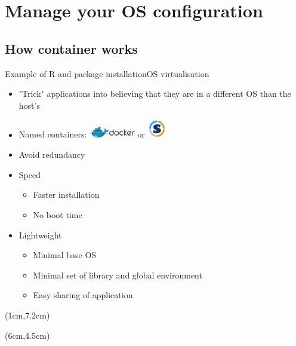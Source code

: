 \section{Manage your OS configuration}
\subsection{How container works}

\begin{frame}{Example of R and package installation}{OS virtualisation}
\begin{itemize}[<+->]
	\item "Trick" applications into believing that they are in a different OS than the host’s
	\item Named containers: \includegraphics[width=2cm, height=0.5cm]{images/docker_logo2.png} or \includegraphics[width=0.8cm, height=0.8cm]{images/singularity_logo.pdf}
	\item Avoid redundancy
	\item<5-> Speed
	\begin{itemize}[<5->]
		\item Faster installation
		\item No boot time
	\end{itemize}
	\item<6-> Lightweight
	\begin{itemize}[<6->]
		\item Minimal base OS
		\item Minimal set of library and global environment 
		\item Easy sharing of application 
	\end{itemize}	
\end{itemize}

\begin{textblock*}{10cm}(1cm,7.2cm) %
\end{textblock*}

\begin{textblock*}{10cm}(6cm,4.5cm) %
\end{textblock*}
\end{frame}


